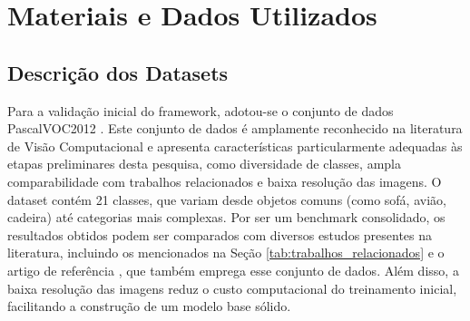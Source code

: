 
\section{Materiais e Dados Utilizados}
\label{dados_utilizados}


\subsection{Descrição dos Datasets}

Para a validação inicial do framework, adotou-se o conjunto de dados \ac{PascalVOC2012} \cite{everingham2010pascal}. Este conjunto de dados é amplamente reconhecido na literatura de Visão Computacional e apresenta características particularmente adequadas às etapas preliminares desta pesquisa, como diversidade de classes, ampla comparabilidade com trabalhos relacionados e baixa resolução das imagens. O dataset contém 21 classes, que variam desde objetos comuns (como sofá, avião, cadeira) até categorias mais complexas. Por ser um benchmark consolidado, os resultados obtidos podem ser comparados com diversos estudos presentes na literatura, incluindo os mencionados na Seção \ref{tab:trabalhos_relacionados} e o artigo de referência \cite{zheng2021continual}, que também emprega esse conjunto de dados. Além disso, a baixa resolução das imagens reduz o custo computacional do treinamento inicial, facilitando a construção de um modelo base sólido. %


